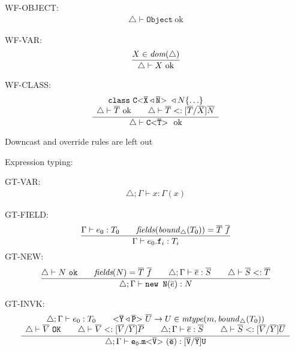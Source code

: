 WF-OBJECT:
\begin{align*}
\triangle \vdash \texttt{Object}\ \text{ok}
\end{align*}

WF-VAR:
\begin{align*}
\frac{\displaystyle 
    X \in \textit{dom}(\triangle)
}{\displaystyle 
    \triangle \vdash X \ \text{ok}
}
\end{align*}

WF-CLASS:
\begin{align*}
\frac{\displaystyle \begin{array}{c}
\texttt{class}\ \mathtt{C {\tt <} \overline{X} \triangleleft \overline{N} {\tt >} \ } \triangleleft N \{ \ldots \} \\
\triangle \vdash \overline{T} \ \text{ok} \quad \quad \triangle \vdash \overline{T} <: [\overline{T}/\overline{X}]\overline{N}
\end{array}
}{\displaystyle 
\triangle \vdash \mathtt{C {\tt <} \overline{T} {\tt >} \ } \ \text{ok}
}
\end{align*}

Downcast and override rules are left out

Expression typing:

GT-VAR:
\begin{align*}
\triangle ; \Gamma \vdash x : \Gamma(x)
\end{align*}


GT-FIELD:
\begin{align*}
\ddfrac{\Gamma \vdash e_0:T_0 \quad \quad \mathit{fields}(\mathit{bound}_\triangle(T_0)) = \overline{T} \ \overline{f}}
{\Gamma \vdash e_0.\mathtt{f}_i : T_i}
\end{align*}
GT-NEW:
\begin{align*}
  \frac{\displaystyle \triangle \vdash N \ \texttt{ok} \quad \quad \textit{fields}(N) = \overline{T}\ \overline{f} \quad \quad
  \triangle; \Gamma \vdash \overline{e} : \overline{S} \quad \quad \triangle \vdash \overline{S} <: \overline{T}
}{\displaystyle 
  \triangle; \Gamma \vdash \texttt{new N}(\overline{e}): N
}
\end{align*}


GT-INVK:
\begin{align*}
\frac{\displaystyle \begin{array}{c}
\triangle; \Gamma \vdash e_0 : T_0 \quad \quad
\mathtt{ {\tt <} \overline{Y} \triangleleft \overline{P} {\tt >} \ } \overline{U} \to U \in \mathit{mtype}(m, \mathit{bound}_\triangle (T_0))\\
\triangle \vdash \overline{V} \ \texttt{OK} \quad \quad
\triangle \vdash \overline{V} <: [\overline{V}/\overline{Y}]\overline{P} \quad \quad
\triangle; \Gamma \vdash \overline{e} : \overline{S} \quad \quad
\triangle \vdash \overline{S} <: [\overline{V}/\overline{Y}]\overline{U}
\end{array}}{\displaystyle \triangle; \Gamma \vdash \mathtt{e_0.\mathtt{m {\tt <} \overline{V} {\tt >} \ }(\overline{e}) : [\overline{V}/\overline{Y}]U }}
\end{align*}


